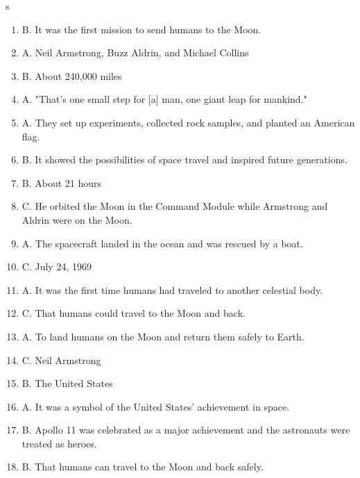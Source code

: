 s\documentclass[12pt]{article}
\begin{document}
\begin{enumerate}
    \item B. It was the first mission to send humans to the Moon.
    \item A. Neil Armstrong, Buzz Aldrin, and Michael Collins
    \item B. About 240,000 miles
    \item A. "That's one small step for [a] man, one giant leap for mankind."
    \item A. They set up experiments, collected rock samples, and planted an American flag.
    \item B. It showed the possibilities of space travel and inspired future generations.
    \item B. About 21 hours
    \item C. He orbited the Moon in the Command Module while Armstrong and Aldrin were on the Moon.
    \item A. The spacecraft landed in the ocean and was rescued by a boat.
    \item C. July 24, 1969
    \item A. It was the first time humans had traveled to another celestial body.
    \item C. That humans could travel to the Moon and back.
    \item A. To land humans on the Moon and return them safely to Earth.
    \item C. Neil Armstrong
    \item B. The United States
    \item A. It was a symbol of the United States' achievement in space.
    \item B. Apollo 11 was celebrated as a major achievement and the astronauts were treated as heroes.
    \item B. That humans can travel to the Moon and back safely.
\end{enumerate}
\end{document}
